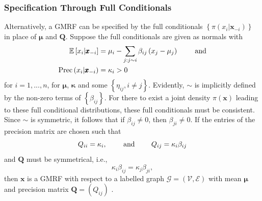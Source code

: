 \subsubsection{Specification Through Full Conditionals}
Alternatively, a GMRF can be specified by the full conditionals $\left\lbrace\pi\left(x_i|\pmb{x}_{-i}\right)\right\rbrace$ in place of $\pmb{\mu}$ and $\pmb{Q}$. Suppose the full conditionals are given as normals with
\begin{align}
    \mathbb{E}\left[x_i|\pmb{x}_{-i}\right] &= \mu_i-\sum_{j:j\sim i}\beta_{ij}\left(x_j-\mu_j\right)\hspace{20pt}\hbox{ and}\\
    \hbox{Prec}\left(x_i|\pmb{x}_{-i}\right) &= \kappa_i>0
\end{align}
for $i=1,...,n$, for $\pmb{\mu}$, $\pmb{\kappa}$ and some $\left\lbrace\eta_{ij},i\neq j\right\rbrace$. Evidently, $\sim$ is implicitly defined by the non-zero terms of $\left\lbrace\beta_{ij}\right\rbrace$. For there to exist a joint density $\pi\left(\pmb{x}\right)$ leading to these full conditional distributions, these full conditionals must be consistent. Since $\sim$ is symmetric, it follows that if $\beta_{ij}\neq 0$, then $\beta_{ji}\neq0$. If the entries of the precision matrix are chosen such that
\begin{equation*}
    Q_{ii}=\kappa_i, \hspace{20pt}\hbox{ and }\hspace{20pt} Q_{ij}=\kappa_i\beta_{ij}
\end{equation*}
and $\pmb{Q}$ must be symmetrical, i.e.,
\begin{equation*}
    \kappa_i\beta_{ij}=\kappa_j\beta_{ji},
\end{equation*}
then $\pmb{x}$ is a GMRF with respect to a labelled graph $\mathcal{G}=\left(\mathcal{V}, \mathcal{E}\right)$ with mean $\pmb{\mu}$ and precision matrix $\pmb{Q}=\left(Q_{ij}\right)$ \autocite[][27]{rue2005gaussian}.
